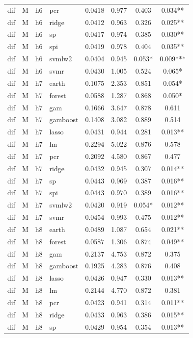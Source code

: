 \begin{ThreePartTable}
\begin{longtable}[t]{llclcccc}
dif & M & h6 & pcr & 0.0418 & 0.977 & 0.403 & 0.034**\\
dif & M & h6 & ridge & 0.0412 & 0.963 & 0.326 & 0.025**\\
dif & M & h6 & sp & 0.0417 & 0.974 & 0.385 & 0.030**\\
dif & M & h6 & spi & 0.0419 & 0.978 & 0.404 & 0.035**\\
dif & M & h6 & svmlw2 & 0.0404 & 0.945 & 0.053* & 0.009***\\
dif & M & h6 & svmr & 0.0430 & 1.005 & 0.524 & 0.065*\\
\addlinespace
dif & M & h7 & earth & 0.1075 & 2.353 & 0.851 & 0.054*\\
dif & M & h7 & forest & 0.0588 & 1.287 & 0.868 & 0.050*\\
dif & M & h7 & gam & 0.1666 & 3.647 & 0.878 & 0.611\\
dif & M & h7 & gamboost & 0.1408 & 3.082 & 0.889 & 0.514\\
dif & M & h7 & lasso & 0.0431 & 0.944 & 0.281 & 0.013**\\
dif & M & h7 & lm & 0.2294 & 5.022 & 0.876 & 0.578\\
dif & M & h7 & pcr & 0.2092 & 4.580 & 0.867 & 0.477\\
dif & M & h7 & ridge & 0.0432 & 0.945 & 0.307 & 0.014**\\
dif & M & h7 & sp & 0.0443 & 0.969 & 0.387 & 0.016**\\
dif & M & h7 & spi & 0.0443 & 0.970 & 0.389 & 0.016**\\
dif & M & h7 & svmlw2 & 0.0420 & 0.919 & 0.054* & 0.012**\\
dif & M & h7 & svmr & 0.0454 & 0.993 & 0.475 & 0.012**\\
\addlinespace
dif & M & h8 & earth & 0.0489 & 1.087 & 0.654 & 0.021**\\
dif & M & h8 & forest & 0.0587 & 1.306 & 0.874 & 0.049**\\
dif & M & h8 & gam & 0.2137 & 4.753 & 0.872 & 0.375\\
dif & M & h8 & gamboost & 0.1925 & 4.283 & 0.876 & 0.408\\
dif & M & h8 & lasso & 0.0426 & 0.947 & 0.330 & 0.013**\\
dif & M & h8 & lm & 0.2144 & 4.770 & 0.872 & 0.381\\
dif & M & h8 & pcr & 0.0423 & 0.941 & 0.314 & 0.011**\\
dif & M & h8 & ridge & 0.0433 & 0.963 & 0.386 & 0.015**\\
dif & M & h8 & sp & 0.0429 & 0.954 & 0.354 & 0.013**\\

\end{longtable}
\end{ThreePartTable}
